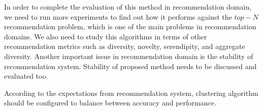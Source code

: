 \documentclass[conference]{IEEEtran}
\begin{document}
In order to complete the evaluation of this method in recommendation domain, 
we need to run more experiments to find out how it performs against the $top-N$ 
recommendation problem, which is one of the main problems in recommendation 
domains. We also need to study this algorithms in terms of other recommendation 
metrics such as diversity, novelty, serendipity, and aggregate diversity. 
Another important issue in recommendation domain is the stability of 
recommendation system. Stability of proposed method needs to be discussed and 
evaluated too. 


According to the expectations 
from recommendation system, clustering algorithm should be configured to balance 
between accuracy and performance.



 

\end{document}
